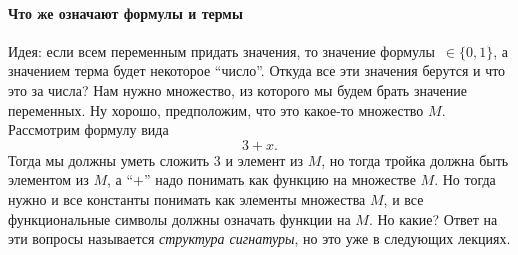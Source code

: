 \paragraph{Что же означают формулы и термы}
Идея: если всем переменным придать значения, то значение формулы~$\in \{0, 1\}$, а значением терма будет некоторое \enquote{число}.
Откуда все эти значения берутся и что это за числа?
Нам нужно множество, из которого мы будем брать значение переменных.
Ну хорошо, предположим, что это какое-то множество $M$.
Рассмотрим формулу вида
$$
    3 + x.
$$
Тогда мы должны уметь сложить 3 и элемент из $M$, но тогда тройка должна быть элементом из $M$, а \enquote{$+$} надо понимать как функцию на множестве $M$.
Но тогда нужно и все константы понимать как элементы множества $M$, и все функциональные символы должны означать функции на $M$.
Но какие?
Ответ на эти вопросы называется {\it структура сигнатуры}, но это уже в следующих лекциях.
